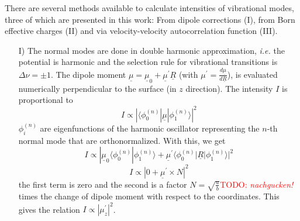 \documentclass[11pt,DIV=13,BCOR=5mm,a4paper,headinclude]{scrbook}
\newcommand\todo[1]{\textcolor{red}{TODO: \textit{{#1}}}}
\renewcommand{\vec}[1]{\underline{#1}}
\begin{document}
There are several methods available to calculate intensities of vibrational modes, three of which are presented in this work: From dipole corrections (I), from Born effective charges (II) and via velocity-velocity autocorrelation function (III).
\begin{itemize}
 \item[I)] The normal modes are done in double harmonic approximation, \textit{i.e.} the potential is harmonic and the selection rule for vibrational transitions is $\Delta \nu=\pm1$.
 The dipole moment $\vec{\mu}=\vec{\mu}_0 + \vec{\mu}^\prime \vec{R}$ (with  $\mu^\prime=\frac{d\vec{\mu}}{d\vec{R}}$), is evaluated numerically perpendicular to the surface (in $z$ direction).
 The intensity $I$ is proportional to 
 \begin{equation}
 I\propto |\langle \phi_0^{(n)}|\vec{\mu}|\phi_1^{(n)} \rangle|^2
 \end{equation}
 $\phi_i^{(n)}$ are eigenfunctions of the harmonic oscillator representing the $n$-th normal mode that are orthonormalized.
 With this, we get
 \begin{equation}
  I\propto |\vec{\mu}_0\langle \phi_0^{(n)}|\phi_1^{(n)} \rangle + \vec{\mu}^\prime\langle \phi_0^{(n)}|\vec{R}|\phi_1^{(n)} \rangle|^2
 \end{equation}
 \begin{equation}
  I\propto |0 + \vec{\mu}^\prime\times N|^2
 \end{equation}
 the first term is zero and the second is a factor $N=\sqrt{\frac{a}{b}}$\todo{nachgucken!} times the change of dipole moment with respect to the coordinates.
 This gives the relation $I\propto |\mu^\prime_z|^2$\cite{dyn-dip,Yang2012}.

\end{itemize}
\end{document}

